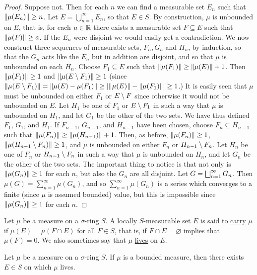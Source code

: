 \begin{proof}
Suppose not. Then for each $n$ we can find a measurable set $E_n$ such that $\norm{\mu(E_n)}\geq n$. Let $E=\bigcup_{n=1}^\infty E_n$, so that $E \in S$. By construction, $\mu$ is unbounded on $E$, that is, for each $a\in\mathbb{R}$ there exists a measurable set $F \subseteq E$ such that $\norm{\mu(F)}\geq a$. If the $E_n$ were disjoint we would easily get a contradiction. We now construct three sequences of measurable sets, $F_n, G_n$ and $H_n$, by induction, so that the $G_n$ acts like the $E_n$ but in addition are disjoint, and so that $\mu$ is unbounded on each $H_n$. Choose $F_1 \subseteq E$ such that $\norm{\mu(F_1)}\geq\norm{\mu(E)}+1$. Then $\norm{\mu(F_1)}\geq1$ and $\norm{\mu(E\setminus F_1)}\geq1$ (since $\norm{\mu(E\setminus F_1)}=\norm{\mu(E)-\mu(F_1)}\geq|\norm{\mu(E)}-\norm{\mu(F_1)}|\geq1$.) It is easily seen that $\mu$ must be unbounded on either $F_1$ or $E\setminus F$ since otherwise it would not be unbounded on $E$. Let $H_1$ be one of $F_1$ or $E\setminus F_1$ in such a way that $\mu$ is unbounded on $H_1$, and let $G_1$ be the other of the two sets. We have thus defined $F_1$, $G_1$, and $H_1$. If $F_{n-1}$, $G_{n-1}$, and $H_{n-1}$ have been chosen, choose $F_n\subseteq H_{n-1}$ such that $\norm{\mu(F_n)}\geq\norm{\mu(H_{n-1})}+1$. Then, as before, $\norm{\mu(F_n)}\geq1$, $\norm{\mu(H_{n-1}\setminus F_n)}\geq1$, and $\mu$ is unbounded on either $F_n$ or $H_{n-1}\setminus F_n$. Let $H_n$ be one of $F_n$ or $H_{n-1}\setminus F_n$ in such a way that $\mu$ is unbounded on $H_n$, and let $G_n$ be the other of the two sets. The important thing to notice is that not only is $\norm{\mu(G_n)}\geq1$ for each $n$, but also the $G_n$ are all disjoint. Let $G=\bigsqcup_{n=1}^\infty G_n$. Then $\mu(G)=\sum_{n=1}^\infty\mu(G_n)$, and so $\sum_{n=1}^\infty\mu(G_n)$ is a series which converges to a finite (since $\mu$ is assumed bounded) value, but this is impossible since $\norm{\mu(G_n)}\geq1$ for each $n$.
\end{proof}

\begin{definition}
Let $\mu$ be a measure on a $\sigma$-ring $S$. A locally $S$-measurable set $E$ is said to \underline{carry} $\mu$ if $\mu(E)=\mu(F\cap E)$ for all $F\in S$, that is, if $F\cap E=\varnothing$ implies that $\mu(F)=0$. We also sometimes say that $\mu$ \underline{lives} on $E$.
\end{definition}

\begin{proposition}
Let $\mu$ be a measure on a $\sigma$-ring $S$. If $\mu$ is a bounded measure, then there exists $E \in S$ on which $\mu$ lives.
\end{proposition}

